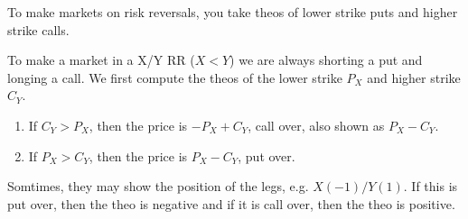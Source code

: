 \documentclass{article}
\begin{document}
    To make markets on risk reversals, you take theos of lower strike puts and higher strike calls. 

    \begin{example}
      To make a market in a X/Y RR ($X < Y$) we are always shorting a put and longing a call. We first compute the theos of the lower strike $P_X$ and higher strike $C_Y$.
      \begin{enumerate}
        \item If $C_Y > P_X$, then the price is $-P_X + C_Y$, call over, also shown as $P_X - C_Y$.
        \item If $P_X > C_Y$, then the price is $P_X - C_Y$, put over.
      \end{enumerate}
      Somtimes, they may show the position of the legs, e.g. $X (-1) / Y (1)$. If this is put over, then the theo is negative and if it is call over, then the theo is positive.
    \end{example}
\end{document}
